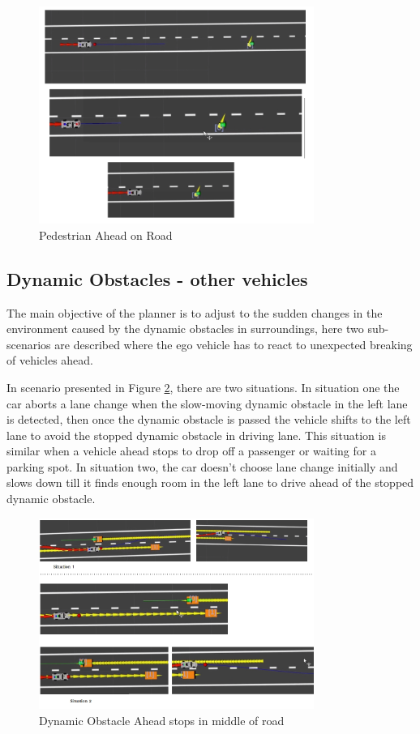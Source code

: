 \begin{figure}[h]
    \centering
    \includegraphics[width=0.8\textwidth]{Images/evaluation/pedestrian_ahead.jpg}
    \caption{Pedestrian Ahead on Road}
    \label{pedestrian_ahead}
\end{figure}

\subsection{Dynamic Obstacles - other vehicles}
The main objective of the planner is to adjust to the sudden changes in the environment caused by the dynamic obstacles in surroundings, here two sub-scenarios are described where the ego vehicle has to react to unexpected breaking of vehicles ahead. 

In scenario presented in Figure \ref{dynamic_1}, there are two situations. In situation one the car aborts a lane change when the slow-moving dynamic obstacle in the left lane is detected, then once the dynamic obstacle is passed the vehicle shifts to the left lane to avoid the stopped dynamic obstacle in driving lane. This situation is similar when a vehicle ahead stops to drop off a passenger or waiting for a parking spot. In situation two, the car doesn't choose lane change initially and slows down till it finds enough room in the left lane to drive ahead of the stopped dynamic obstacle. 

\begin{figure}[h]
    \centering
    \includegraphics[width=0.8\textwidth]{Images/evaluation/dynamic_ahead_breaking1.jpg}
    \caption{Dynamic Obstacle Ahead stops in middle of road}
    \label{dynamic_1}
\end{figure}

